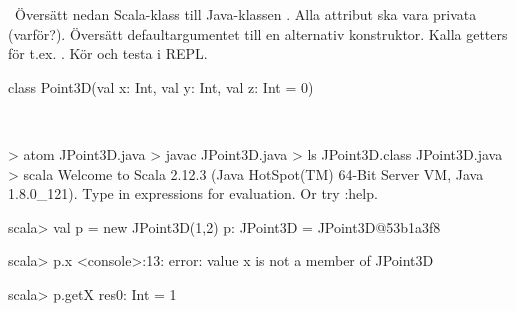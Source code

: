\QUESTEND



\QUESTBEGIN

\Task \what~Översätt nedan Scala-klass till Java-klassen . Alla attribut ska vara privata (varför?). Översätt defaultargumentet till en alternativ konstruktor. Kalla getters för t.ex. . Kör  och testa i REPL.

\begin{Code}
class Point3D(val x: Int, val y: Int, val z: Int = 0)
\end{Code}

\SOLUTION

\TaskSolved \what~


\begin{REPL}
> atom JPoint3D.java
> javac JPoint3D.java
> ls
JPoint3D.class  JPoint3D.java
> scala
Welcome to Scala 2.12.3 (Java HotSpot(TM) 64-Bit Server VM, Java 1.8.0_121).
Type in expressions for evaluation. Or try :help.

scala> val p = new JPoint3D(1,2)
p: JPoint3D = JPoint3D@53b1a3f8

scala> p.x
<console>:13: error: value x is not a member of JPoint3D

scala> p.getX
res0: Int = 1
\end{REPL}

\QUESTEND




\QUESTBEGIN

